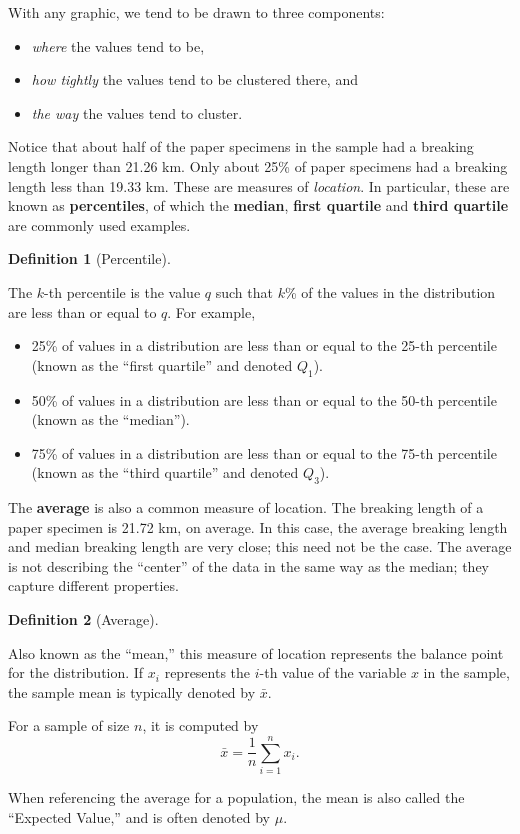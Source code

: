 \documentclass[
  letterpaper,
  DIV=11,
  numbers=noendperiod]{scrreprt}
\providecommand{\tightlist}{%
  \setlength{\itemsep}{0pt}\setlength{\parskip}{0pt}}\usepackage{longtable,booktabs,array}
\theoremstyle{plain}
\theoremstyle{definition}
\theoremstyle{definition}
\newtheorem{definition}{Definition}[chapter]
\theoremstyle{remark}
\begin{document}
With any graphic, we tend to be drawn to three components:

\begin{itemize}
\tightlist
\item
  \emph{where} the values tend to be,
\item
  \emph{how tightly} the values tend to be clustered there, and
\item
  \emph{the way} the values tend to cluster.
\end{itemize}

Notice that about half of the paper specimens in the sample had a
breaking length longer than 21.26 km. Only about 25\% of paper specimens
had a breaking length less than 19.33 km. These are measures of
\emph{location}. In particular, these are known as \textbf{percentiles},
of which the \textbf{median}, \textbf{first quartile} and \textbf{third
quartile} are commonly used examples.

\begin{definition}[Percentile]\protect\hypertarget{def-percentile}{}\label{def-percentile}

The \(k\)-th percentile is the value \(q\) such that \(k\)\% of the
values in the distribution are less than or equal to \(q\). For example,

\begin{itemize}
\tightlist
\item
  25\% of values in a distribution are less than or equal to the 25-th
  percentile (known as the ``first quartile'' and denoted \(Q_1\)).
\item
  50\% of values in a distribution are less than or equal to the 50-th
  percentile (known as the ``median'').
\item
  75\% of values in a distribution are less than or equal to the 75-th
  percentile (known as the ``third quartile'' and denoted \(Q_3\)).
\end{itemize}

\end{definition}

The \textbf{average} is also a common measure of location. The breaking
length of a paper specimen is 21.72 km, on average. In this case, the
average breaking length and median breaking length are very close; this
need not be the case. The average is not describing the ``center'' of
the data in the same way as the median; they capture different
properties.

\begin{definition}[Average]\protect\hypertarget{def-average}{}\label{def-average}

Also known as the ``mean,'' this measure of location represents the
balance point for the distribution. If \(x_i\) represents the \(i\)-th
value of the variable \(x\) in the sample, the sample mean is typically
denoted by \(\bar{x}\).

For a sample of size \(n\), it is computed by
\[\bar{x} = \frac{1}{n}\sum_{i=1}^{n} x_i.\]

When referencing the average for a population, the mean is also called
the ``Expected Value,'' and is often denoted by \(\mu\).

\end{definition}
\end{document}
